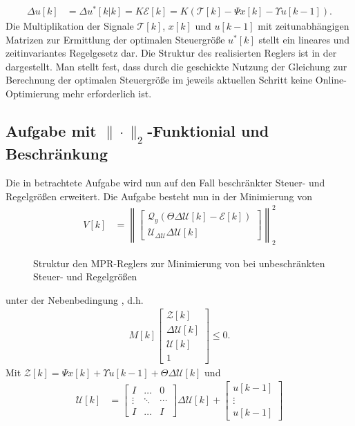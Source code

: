 \begin{remark}
\begin{align*}
	\Delta u[k] & = \Delta u^{\ast}[k|k] = K\mathcal{E}[k]=K\left(\mathcal{T}[k]-\Psi x[k]-\Upsilon u[k-1]\right).
\end{align*}
Die Multiplikation der Signale $\mathcal{T}[k]$, $x[k]$ und $u[k-1]$ mit zeitunabhängigen Matrizen zur Ermittlung der optimalen Steuergröße $u^{\ast}[k]$ stellt ein lineares und
zeitinvariantes Regelgesetz dar. Die Struktur des realisierten Reglers ist in der  dargestellt. Man stellt fest, dass durch die geschickte
Nutzung der Gleichung  zur Berechnung der optimalen Steuergröße im jeweils aktuellen Schritt keine Online-Optimierung mehr erforderlich ist.
\end{remark}

\subsection{Aufgabe mit $\|\cdot\|_2$-Funktionial und Beschränkung}
\label{subsec:aufgabe_quad_mit_beschr}
Die in  betrachtete Aufgabe wird nun auf den Fall beschränkter Steuer- und Regelgrößen erweitert. Die Aufgabe besteht nun in der
Minimierung von 
\begin{align}
V[k] & = \left\| \begin{bmatrix}
	\mathcal{Q}_y \left(\Theta\Delta\mathcal{U}[k]-\mathcal{E}[k] \right)\\
	\mathcal{U}_{\Delta\mathcal{U}}\Delta\mathcal{U}[k]
\end{bmatrix} \right\|_2^2
\end{align}
\begin{figure}[htb]
	\centering
	
	\caption{Struktur den \ac{MPR}-Reglers zur Minimierung von  bei unbeschränkten Steuer- und Regelgrößen}
	\label{fig:kap_4_struktur_mpr}
\end{figure}
unter der Nebenbedingung , d.h.
\begin{align}
	M[k]\begin{bmatrix}
	\mathcal{Z}[k]\\ \Delta\mathcal{U}[k]\\ \mathcal{U}[k]\\ 1
	\end{bmatrix}\le 0. \label{eqn:kap_4_nebenbedinungen_beschr}
\end{align}
Mit $\mathcal{Z}[k]=\Psi x[k]+\Upsilon u[k-1]+\Theta\Delta\mathcal{U}[k]$ und
\begin{align*}
\mathcal{U}[k] & = \begin{bmatrix}
I & \ldots & 0\\
\vdots & \ddots & \cdots\\
I & \ldots & I
\end{bmatrix}\Delta\mathcal{U}[k]+\begin{bmatrix}
u[k-1]\\ \vdots\\ u[k-1]
\end{bmatrix}
\end{align*}
